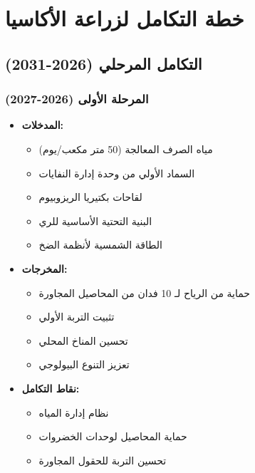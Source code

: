 \section{خطة التكامل لزراعة الأكاسيا}

\subsection{التكامل المرحلي (2026-2031)}

\subsubsection{المرحلة الأولى (2026-2027)}
\begin{itemize}
    \item \textbf{المدخلات:}
    \begin{itemize}
        \item مياه الصرف المعالجة (50 متر مكعب/يوم)
        \item السماد الأولي من وحدة إدارة النفايات
        \item لقاحات بكتيريا الريزوبيوم
        \item البنية التحتية الأساسية للري
        \item الطاقة الشمسية لأنظمة الضخ
    \end{itemize}
    \item \textbf{المخرجات:}
    \begin{itemize}
        \item حماية من الرياح لـ 10 فدان من المحاصيل المجاورة
        \item تثبيت التربة الأولي
        \item تحسين المناخ المحلي
        \item تعزيز التنوع البيولوجي
    \end{itemize}
    \item \textbf{نقاط التكامل:}
    \begin{itemize}
        \item نظام إدارة المياه
        \item حماية المحاصيل لوحدات الخضروات
        \item تحسين التربة للحقول المجاورة
    \end{itemize}
\end{itemize}

